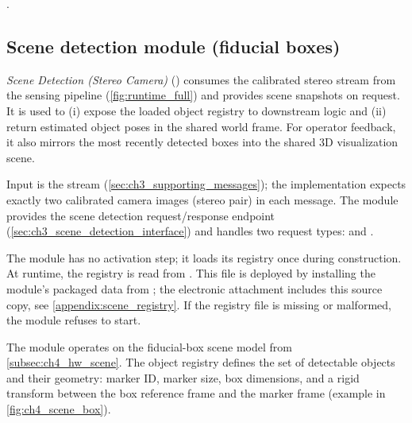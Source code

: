 .

\subsection{Scene detection module (fiducial boxes)}
\label{subsec:ch4_mod_scene_detection}

\emph{Scene Detection (Stereo Camera)} () consumes the calibrated stereo stream from the sensing pipeline (\autoref{fig:runtime_full}) and provides scene snapshots on request.
It is used to (i) expose the loaded object registry to downstream logic and (ii) return estimated object poses in the shared world frame.
For operator feedback, it also mirrors the most recently detected boxes into the shared 3D visualization scene.

Input is the  stream (\autoref{sec:ch3_supporting_messages}); the implementation expects exactly two calibrated camera images (stereo pair) in each message.
The module provides the scene detection request/response endpoint (\autoref{sec:ch3_scene_detection_interface}) and handles two request types:  and .

The module has no activation step; it loads its registry once during construction.
At runtime, the registry is read from .
This file is deployed by installing the module's packaged data from ; the electronic attachment includes this source copy, see \autoref{appendix:scene_registry}.
If the registry file is missing or malformed, the module refuses to start.

The module operates on the fiducial-box scene model from \autoref{subsec:ch4_hw_scene}.
The object registry defines the set of detectable objects and their geometry: marker ID, marker size, box dimensions, and a rigid transform between the box reference frame and the marker frame (example in \autoref{fig:ch4_scene_box}).

